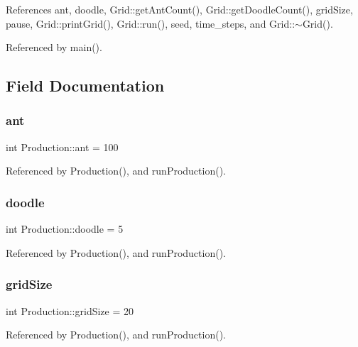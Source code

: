 References ant, doodle, Grid\+::get\+Ant\+Count(), Grid\+::get\+Doodle\+Count(), grid\+Size, pause, Grid\+::print\+Grid(), Grid\+::run(), seed, time\+\_\+steps, and Grid\+::$\sim$\+Grid().



Referenced by main().



\subsection{Field Documentation}
\mbox{\label{classProduction_a643731b2d3398904499a22a852cfe96e}} 
\subsubsection{ant}
{\footnotesize\ttfamily int Production\+::ant = 100\hspace{0.3cm}{\ttfamily [private]}}



Referenced by Production(), and run\+Production().

\mbox{\label{classProduction_a12c0426899253bab9d154480ac27b1e7}} 
\subsubsection{doodle}
{\footnotesize\ttfamily int Production\+::doodle = 5\hspace{0.3cm}{\ttfamily [private]}}



Referenced by Production(), and run\+Production().

\mbox{\label{classProduction_aec26b656d2e7519d1a1898810bd1c0da}} 
\subsubsection{grid\+Size}
{\footnotesize\ttfamily int Production\+::grid\+Size = 20\hspace{0.3cm}{\ttfamily [private]}}



Referenced by Production(), and run\+Production().

\mbox{\label{classProduction_af570feb7415a4d5b1a9176dacd9d6b64}} 
